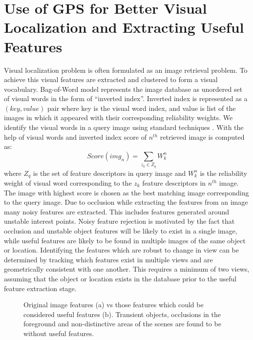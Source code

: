 \section{Use of GPS for Better Visual Localization and Extracting Useful Features}
\label{sec:gps_localization_feature}
Visual localization problem is often formulated as an 
image retrieval problem. To achieve this visual features are extracted and 
clustered to form a visual vocabulary. Bag-of-Word model 
represents the image database as unordered set of visual 
words in the form of ``inverted index''. Inverted index is 
represented as a $(key,value)$ pair where key is the 
visual word index, and value is list of the images in which 
it appeared with their corresponding reliability weights. We 
identify the visual words in a query image using standard techniques \cite{nister2006scalable}.
With the help of visual words and inverted index score of $n^{th}$ retrieved image is computed as:
\begin{equation}
Score(img_n)= \sum_{z_k \in Z_q}W_k^n 
\label{eq:cal_score_query_img}
\end{equation} 
where $Z_q$ is the set of feature descriptors in query image 
and $W_k^n$ is the reliability weight of visual word corresponding 
to the $z_k$ feature descriptors in $n^{th}$ image. The image with 
highest score is chosen as the best matching image corresponding 
to the query image. Due to occlusion while extracting the features from an image many noisy
features are extracted. This includes features generated around 
unstable interest points. Noisy feature rejection is motivated by 
the fact that occlusion and unstable object features will be 
likely to exist in a single image, while useful features are 
likely to be found in multiple images of the same object or location. 
Identifying the features which are robust to change
in view can be determined by tracking which features exist in multiple 
views and are geometrically consistent with one another. 
This requires a minimum of two views, assuming that the object or location
exists in the database prior to the useful feature extraction stage.

\begin{figure}[t]
\centering
{}
\caption{Original image features (a) vs those features which could 
be considered useful features (b). Transient objects, occlusions in the 
foreground and non-distinctive areas of the scenes are found to 
be without useful features.}
\label{fig:all_feature_useful_feature}
\end{figure}

